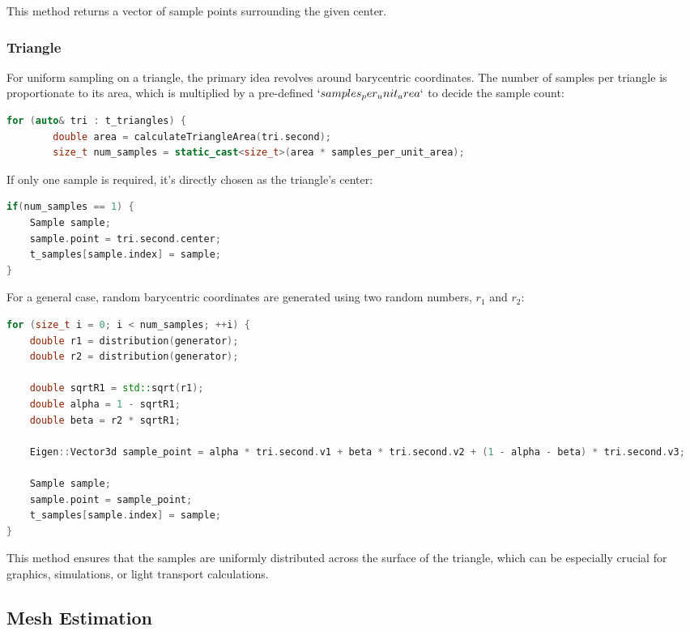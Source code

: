 \documentclass[11pt, a4paper,oneside,chapterprefix=false]{scrbook}
\begin{document}
This method returns a vector of sample points surrounding the given center.

\subsubsection{Triangle}

For uniform sampling on a triangle, the primary idea revolves around barycentric coordinates. The number of samples per triangle is proportionate to its area, which is multiplied by a pre-defined $`samples_per_unit_area`$ to decide the sample count:

\begin{lstlisting}[language=C++, caption=Triangle Sampling Initialization]
    for (auto& tri : t_triangles) {
        double area = calculateTriangleArea(tri.second);
        size_t num_samples = static_cast<size_t>(area * samples_per_unit_area);
\end{lstlisting}

If only one sample is required, it's directly chosen as the triangle's center:

\begin{lstlisting}[language=C++, caption=Triangle Center Sampling]
if(num_samples == 1) {
	Sample sample;
	sample.point = tri.second.center;
	t_samples[sample.index] = sample;
}
\end{lstlisting}

For a general case, random barycentric coordinates are generated using two random numbers, \( r_1 \) and \( r_2 \):

\begin{lstlisting}[language=C++, caption=Barycentric Coordinate Sampling]
for (size_t i = 0; i < num_samples; ++i) {
	double r1 = distribution(generator);
	double r2 = distribution(generator);

	double sqrtR1 = std::sqrt(r1);
	double alpha = 1 - sqrtR1;
	double beta = r2 * sqrtR1;

	Eigen::Vector3d sample_point = alpha * tri.second.v1 + beta * tri.second.v2 + (1 - alpha - beta) * tri.second.v3;

	Sample sample;
	sample.point = sample_point;
	t_samples[sample.index] = sample;
}
\end{lstlisting}

This method ensures that the samples are uniformly distributed across the surface of the triangle, which can be especially crucial for graphics, simulations, or light transport calculations.


\subsection{Mesh Estimation}\label{sec:mesh estimation}
\end{document}
